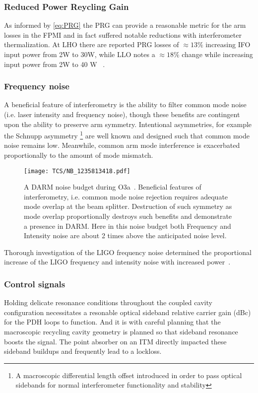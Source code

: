 \subsubsection{Reduced Power Reycling Gain}
As informed by \autoref{eq:PRG} the PRG can provide a reasonable metric for the arm losses in the FPMI and in fact suffered notable reductions with interferometer thermalization. At LHO there are reported PRG losses of $\approx 13\%$ increasing IFO input power from 2W to 30W, while LLO notes a $\approx 18\%$ change while increasing input power from 2W to 40 W ~\cite{elog:2019_01_21:cahillane}.

\subsubsection{Frequency noise}
A beneficial feature of interferometry is the ability to filter common mode noise (i.e. laser intensity and frequency noise), though these benefits are contingent upon the ability to preserve arm symmetry. Intentional asymmetries, for example the Schnupp asymmetry \footnote{A macroscopic differential length offset introduced in order to pass optical sidebands for normal interferometer functionality and stability} are well known and designed such that common mode noise remains low. Meanwhile, common arm mode interference is exacerbated proportionally to the amount of mode mismatch.

\begin{figure}[H]
    \texttt{[image: TCS/NB\_1235813418.pdf]}
    \caption{A DARM noise budget during O3a~\cite{elog:2018:dwyer}. Beneficial features of interferometry, i.e. common mode noise rejection requires adequate mode overlap at the beam splitter. Destruction of such symmetry as mode overlap proportionally destroys such benefits and demonstrate a presence in DARM. Here in this noise budget both Frequency and Intensity noise are about 2 times above the anticipated noise level. }  
    \label{fig:high_freqnoise}
\end{figure}

Thorough investigation of the LIGO frequency noise determined the proportional increase of the LIGO frequency and intensity noise with increased power~\cite{buikema:2020}.

\subsubsection{Control signals}
Holding delicate resonance conditions throughout the coupled cavity configuration necessitates a resonable optical sideband relative carrier gain (dBc) for the PDH loops to function. And it is with careful planning that the macroscopic recycling cavity geometry is planned so that sideband resonance boosts the signal. The point absorber on an ITM directly impacted these sideband buildups and frequently lead to a lockloss. 

